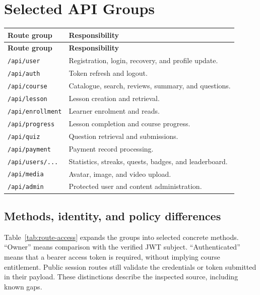 \documentclass[12pt,a4paper,oneside]{report}
\begin{document}
\chapter{Selected API Groups}
\begin{longtable}{P{0.28\textwidth}P{0.61\textwidth}}\toprule
\textbf{Route group} & \textbf{Responsibility}\\\midrule\endfirsthead
\toprule\textbf{Route group} & \textbf{Responsibility}\\\midrule\endhead
\texttt{/api/user} & Registration, login, recovery, and profile update.\\
\texttt{/api/auth} & Token refresh and logout.\\
\texttt{/api/course} & Catalogue, search, reviews, summary, and questions.\\
\texttt{/api/lesson} & Lesson creation and retrieval.\\
\texttt{/api/enrollment} & Learner enrolment and reads.\\
\texttt{/api/progress} & Lesson completion and course progress.\\
\texttt{/api/quiz} & Question retrieval and submissions.\\
\texttt{/api/payment} & Payment record processing.\\
\texttt{/api/users/...} & Statistics, streaks, quests, badges, and leaderboard.\\
\texttt{/api/media} & Avatar, image, and video upload.\\
\texttt{/api/admin} & Protected user and content administration.\\
\bottomrule\end{longtable}

\section{Methods, identity, and policy differences}
Table~\ref{tab:route-access} expands the groups into selected concrete methods.
``Owner'' means comparison with the verified JWT subject. ``Authenticated'' means
that a bearer access token is required, without implying course entitlement.
Public session routes still validate the credentials or token submitted in their
payload. These distinctions describe the inspected source, including known gaps.
\end{document}
